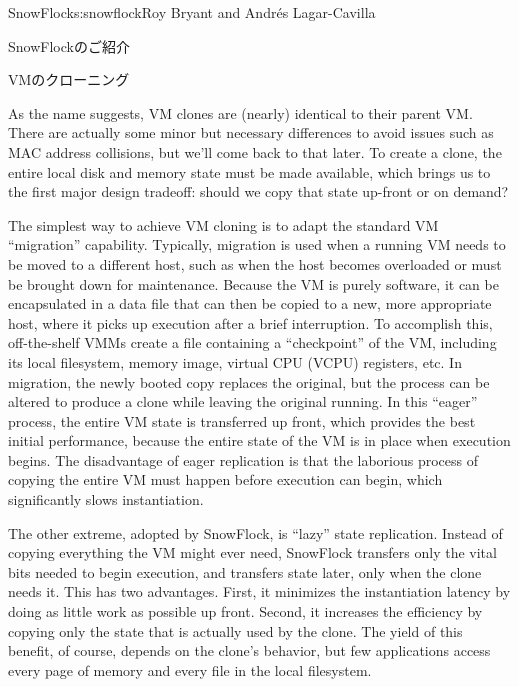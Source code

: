 \begin{aosachapter}{SnowFlock}{s:snowflock}{Roy Bryant and Andr\'e{s} Lagar-Cavilla}
\begin{aosasect1}{SnowFlockのご紹介}
\end{aosasect1}

\begin{aosasect1}{VMのクローニング}

As the name suggests, VM clones are (nearly) identical to their parent
VM\@. There are actually some minor but necessary differences to avoid
issues such as MAC address collisions, but we'll come back to that
later. To create a clone, the entire local disk and memory state must
be made available, which brings us to the first major design tradeoff:
should we copy that state up-front or on demand?

The simplest way to achieve VM cloning is to adapt the standard VM
``migration'' capability.  Typically, migration is used when a running
VM needs to be moved to a different host, such as when the host
becomes overloaded or must be brought down for maintenance. Because
the VM is purely software, it can be encapsulated in a data file that
can then be copied to a new, more appropriate host, where it picks up
execution after a brief interruption. To accomplish this,
off-the-shelf VMMs create a file containing a ``checkpoint'' of the VM,
including its local filesystem, memory image, virtual CPU (VCPU)
registers, etc. In migration, the newly booted copy replaces the
original, but the process can be altered to produce a clone while
leaving the original running. In this ``eager'' process, the entire VM
state is transferred up front, which provides the best initial
performance, because the entire state of the VM is in place when
execution begins.  The disadvantage of eager replication is that the
laborious process of copying the entire VM must happen before
execution can begin, which significantly slows instantiation.

The other extreme, adopted by SnowFlock, is ``lazy'' state
replication.  Instead of copying everything the VM might ever need,
SnowFlock transfers only the vital bits needed to begin execution, and
transfers state later, only when the clone needs it. This has two
advantages.  First, it minimizes the instantiation latency by doing as
little work as possible up front. Second, it increases the efficiency
by copying only the state that is actually used by the clone. The
yield of this benefit, of course, depends on the clone's behavior, but
few applications access every page of memory and every file in the
local filesystem.


\end{aosasect1}
\end{aosachapter}
